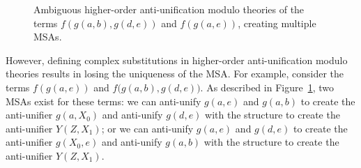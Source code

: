 \begin{figure}[p]
\centering{}
\vspace*{1em}

\centering{}
\caption[Ambiguous higher-order anti-unification modulo theories of two terms.]{Ambiguous higher-order anti-unification modulo theories of the terms $f(g(a,b), g(d,e))$
and $f(g(a,e))$, creating multiple MSAs.}
  \label{fig:multipleMSA}
\end{figure}

However, defining complex substitutions in higher-order anti-unification modulo theories results in losing the uniqueness of the MSA. For example, consider the terms $f(g(a,e))$ and $f(g(a,b),$\linebreak$g(d,e))$. As described in Figure~\ref{fig:multipleMSA}, two MSAs exist for these terms: we can anti-unify $g(a,e)$ and $g(a,b)$ to create the anti-unifier $g(a,X_0)$ and anti-unify $g(d,e)$ with the \NIL{} structure to create the anti-unifier $Y(Z,X_1)$; or we can anti-unify $g(a,e)$ and $g(d,e)$ to create the anti-unifier $g(X_0,e)$ and anti-unify $g(a,b)$ with the \NIL{} structure to create the anti-unifier $Y(Z,X_1)$.

